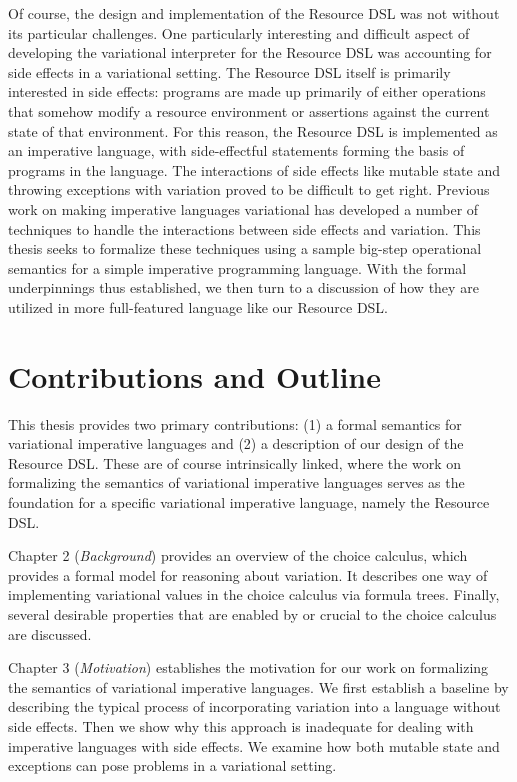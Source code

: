 \documentclass[12pt,oneside]{book}
\begin{document}
Of course, the design and implementation of the Resource DSL was not without its particular challenges. One particularly interesting and difficult aspect of developing
the variational interpreter for the Resource DSL was accounting for side effects in a variational setting. The Resource DSL itself is primarily interested in side effects: programs are
made up primarily of either operations that somehow modify a resource environment or assertions against the current state of that environment. For this reason, the
Resource DSL is implemented as an imperative language, with side-effectful statements forming the basis of programs in the language. The interactions of side effects
like mutable state and throwing exceptions with variation proved to be difficult to get right. Previous work on making imperative languages variational has developed a
number of techniques to handle the interactions between side effects and variation. This thesis seeks to formalize these techniques using a sample big-step operational
semantics for a simple imperative programming language. With the formal underpinnings thus established, we then turn to a discussion of how they are utilized in more
full-featured language like our Resource DSL.

\section{Contributions and Outline}

This thesis provides two primary contributions: (1) a formal semantics for variational imperative languages
and (2) a description of our design of the Resource DSL. These are of course intrinsically linked, where
the work on formalizing the semantics of variational imperative languages serves as the foundation for
a specific variational imperative language, namely the Resource DSL.

Chapter 2 (\emph{Background}) provides an overview of the choice calculus, which provides a formal
model for reasoning about variation. It describes one way of implementing variational values in the
choice calculus via formula trees. Finally, several desirable properties that are enabled by or
crucial to the choice calculus are discussed.

Chapter 3 (\emph{Motivation}) establishes the motivation for our work on formalizing
the semantics of variational imperative languages. We first establish
a baseline by describing the typical process of incorporating variation into
a language without side effects. Then we show why this approach is inadequate
for dealing with imperative languages with side effects. We examine how both
mutable state and exceptions can pose problems in a variational setting.
\end{document}
